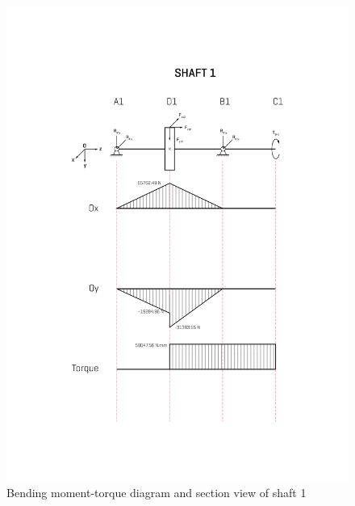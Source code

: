 \begin{figure}[ht]
	\centering
	\includegraphics[width=0.8\linewidth]{mshaft1}
	\caption{Bending moment-torque diagram and section view of shaft 1}
	\label{mshaft1}
\end{figure}


